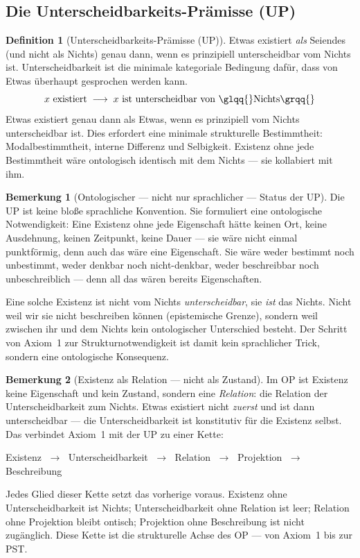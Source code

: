 \documentclass[11pt,a4paper]{article}
\theoremstyle{plain}
\theoremstyle{definition}
\newtheorem{definition}{Definition}[section]
\newtheorem{remark}{Bemerkung}[section]
\begin{document}
\subsection{Die Unterscheidbarkeits-Pr\"{a}misse (UP)}

\begin{definition}[Unterscheidbarkeits-Pr\"{a}misse (UP)]
Etwas existiert \emph{als} Seiendes (und nicht als Nichts) genau dann, wenn es prinzipiell
unterscheidbar vom Nichts ist. Unterscheidbarkeit ist die minimale kategoriale Bedingung
daf\"{u}r, dass von \glqq{}Etwas\grqq{} \"{u}berhaupt gesprochen werden kann.
\[
  x\text{ existiert}
  \;\longrightarrow\;
  x\text{ ist unterscheidbar von \glqq{}Nichts\grqq{}}
\]
Etwas existiert genau dann als Etwas, wenn es prinzipiell vom Nichts unterscheidbar ist.
Dies erfordert eine minimale strukturelle Bestimmtheit: Modalbestimmtheit, interne
Differenz und Selbigkeit. Existenz ohne jede Bestimmtheit w\"{a}re ontologisch identisch
mit dem Nichts --- sie kollabiert mit ihm.
\end{definition}

\begin{remark}[Ontologischer --- nicht nur sprachlicher --- Status der UP]
Die UP ist keine blo\ss{}e sprachliche Konvention. Sie formuliert eine ontologische
Notwendigkeit: Eine Existenz ohne jede Eigenschaft h\"{a}tte keinen Ort, keine Ausdehnung,
keinen Zeitpunkt, keine Dauer --- sie w\"{a}re nicht einmal punktf\"{o}rmig, denn auch das
w\"{a}re eine Eigenschaft. Sie w\"{a}re weder bestimmt noch unbestimmt, weder denkbar noch
nicht-denkbar, weder beschreibbar noch unbeschreiblich --- denn all das w\"{a}ren bereits
Eigenschaften.

Eine solche \glqq{}Existenz\grqq{} ist nicht vom Nichts \emph{unterscheidbar}, sie
\emph{ist} das Nichts. Nicht weil wir sie nicht beschreiben k\"{o}nnen (epistemische
Grenze), sondern weil zwischen ihr und dem Nichts kein ontologischer Unterschied besteht.
Der Schritt von Axiom~1 zur Strukturnotwendigkeit ist damit kein sprachlicher Trick,
sondern eine ontologische Konsequenz.
\end{remark}

\begin{remark}[Existenz als Relation --- nicht als Zustand]
Im OP ist Existenz keine Eigenschaft und kein Zustand, sondern eine \emph{Relation}:
die Relation der Unterscheidbarkeit zum Nichts. Etwas existiert nicht \emph{zuerst}
und ist dann unterscheidbar --- die Unterscheidbarkeit ist konstitutiv f\"{u}r die
Existenz selbst. Das verbindet Axiom~1 mit der UP zu einer Kette:

\begin{center}
Existenz $\;\longrightarrow\;$ Unterscheidbarkeit $\;\longrightarrow\;$ Relation
$\;\longrightarrow\;$ Projektion $\;\longrightarrow\;$ Beschreibung
\end{center}

Jedes Glied dieser Kette setzt das vorherige voraus. Existenz ohne Unterscheidbarkeit
ist Nichts; Unterscheidbarkeit ohne Relation ist leer; Relation ohne Projektion bleibt
ontisch; Projektion ohne Beschreibung ist nicht zug\"{a}nglich. Diese Kette ist die
strukturelle Achse des OP --- von Axiom~1 bis zur PST.
\end{remark}
\end{document}
